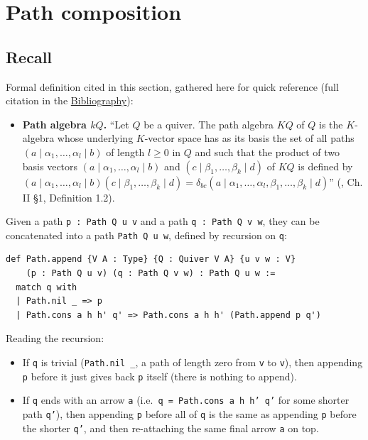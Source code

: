 \section{Path composition}\label{sec:11-path-algebras:05-path-composition:1}

\subsection{Recall}\label{sec:11-path-algebras:05-path-composition:2}

Formal definition cited in this section, gathered here for quick reference (full citation in the \hyperref[sec:root:bibliography:1]{Bibliography}):

\begin{itemize}
\tightlist
\item
  \textbf{Path algebra \(kQ\).} ``Let \(Q\) be a quiver. The path algebra \(KQ\) of \(Q\) is the \(K\)-algebra whose underlying \(K\)-vector space has as its basis the set of all paths \((a \mid \alpha_1, \ldots, \alpha_l
  \mid b)\) of length \(l \geq 0\) in \(Q\) and such that the product of two basis vectors \((a \mid \alpha_1, \ldots, \alpha_l \mid b)\) and \((c \mid \beta_1, \ldots, \beta_k \mid d)\) of \(KQ\) is defined by \((a \mid \alpha_1, \ldots, \alpha_l \mid b)(c \mid \beta_1, \ldots,
  \beta_k \mid d) = \delta_{bc}(a \mid \alpha_1, \ldots, \alpha_l,
  \beta_1, \ldots, \beta_k \mid d)\)'' (\cite{AssemSimsonSkowronski2006}, Ch. II §1, Definition 1.2).
\end{itemize}

Given a path \texttt{p : Path Q u v} and a path \texttt{q : Path Q v w}, they can be concatenated into a path \texttt{Path Q u w}, defined by recursion on \texttt{q}:

\begin{lstlisting}
def Path.append {V A : Type} {Q : Quiver V A} {u v w : V}
    (p : Path Q u v) (q : Path Q v w) : Path Q u w :=
  match q with
  | Path.nil _ => p
  | Path.cons a h h' q' => Path.cons a h h' (Path.append p q')
\end{lstlisting}

Reading the recursion:

\begin{itemize}
\tightlist
\item
  If \texttt{q} is trivial (\texttt{Path.nil \_\allowbreak{}}, a path of length zero from \texttt{v} to \texttt{v}), then appending \texttt{p} before it just gives back \texttt{p} itself (there is nothing to append).
\item
  If \texttt{q} ends with an arrow \texttt{a} (i.e.~\texttt{q = Path.cons a h h' q'} for some shorter path \texttt{q'}), then appending \texttt{p} before all of \texttt{q} is the same as appending \texttt{p} before the shorter \texttt{q'}, and then re-attaching the same final arrow \texttt{a} on top.
\end{itemize}

